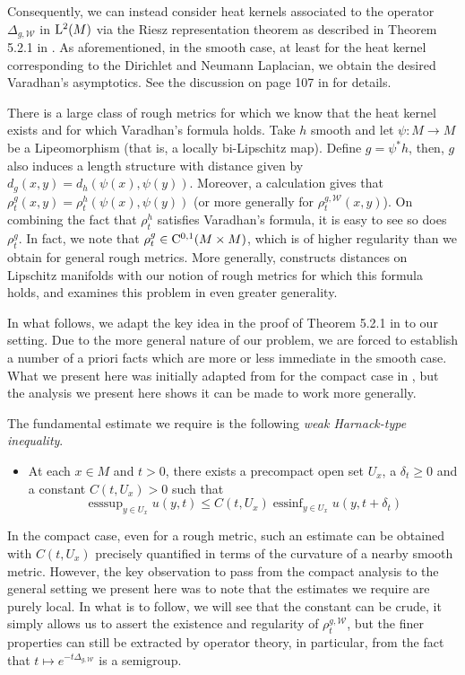 \documentclass[a4paper, 12pt]{amsart}
\numberwithin{equation}{section}
\renewcommand{\~}{\tilde}
\renewcommand{\-}{\bar}
\newcommand{\8}{\infty}
\newcommand{\cW}{\mathcal{W}}
\DeclareMathOperator{\esssup}{esssup}
\DeclareMathOperator{\essinf}{essinf}
\newcommand{\pullb}[1]{{#1}^\ast}			%
\newcommand{\Lp}[2][{}]{{\rm L}^{#2}_{\rm #1}}		%
\newcommand{\Ck}[2][{}]{{\rm C}^{#2}_{\rm #1}}		%
\newcommand{\hk}{\rho}
\begin{document}
Consequently, we can instead consider heat kernels
associated to the operator $\Delta_{g,\cW}$ in $\Lp{2}(M)$
via the Riesz representation theorem as described in Theorem 
5.2.1 in \cite{Davies}. As aforementioned, in the smooth case,
at least for the heat kernel corresponding to the 
Dirichlet and Neumann Laplacian, we obtain the desired  Varadhan's
asymptotics. See the discussion on page 107 in \cite{ERS} for details.

There is a large class of rough metrics
for which we know that the heat kernel exists
and for which Varadhan's formula holds. 
Take $h$ smooth and let $\psi:M \to M$
be a Lipeomorphism (that is, a locally bi-Lipschitz map).
Define $g = \pullb{\psi}h$, then, $g$ 
also induces a length structure with 
distance given by $d_g(x,y) = d_h(\psi(x), \psi(y))$.
Moreover, a calculation gives
that $\hk^{g}_t(x,y) = \hk^{h}_t(\psi(x), \psi(y))$
(or more generally for $\hk^{g,\cW}_t(x,y)$). 
On combining the fact that $\hk^h_t$ satisfies
Varadhan's formula, it is easy to see
so does $\hk^{g}_t$. In fact, we 
note that $\hk^g_t \in \Ck{0,1}(M \times M)$,
which is of higher regularity than we
obtain for general rough metrics.
More generally, \cite{Norris} constructs
distances on Lipschitz manifolds with our
notion of rough metrics for which this 
formula holds, and \cite{ERS} examines
this problem in even greater generality.

In what follows, we adapt the key idea in 
the proof of Theorem 5.2.1 in \cite{Davies}
to our setting. Due to the more general 
nature of our problem, we are forced to 
establish a number of a priori facts which 
are more or less immediate in the smooth case.
What we present here was initially adapted from \cite{SC} 
for the compact case in \cite{BCont}, but 
the analysis we present here shows it can be made to work more generally. 

The fundamental estimate we
require is the following \emph{weak Harnack-type inequality}.
\begin{itemize}
\item[] At each $x \in M$ and $t > 0$, there exists a precompact
open set $U_x$, a $\delta_t \geq 0$ and a constant $C(t, U_x)  > 0$ such that
\begin{equation}
\tag{H}
\label{eq:Harnack}
\esssup_{y \in U_x} u(y,t) 
	\leq C(t, U_x)  \essinf_{y \in U_x} u(y, t + \delta_t)
\end{equation}
\end{itemize}

In the compact case, even for a
rough metric, such an estimate can be
obtained with $C(t,U_x)$ precisely quantified
in terms of the curvature of a nearby smooth metric.
However, the key observation to pass from the compact analysis
to the general setting we present here was to note that
the estimates we require are purely local. In 
what is to follow, we will see that the constant can be
crude, it simply allows us to assert the existence and regularity
of $\hk^{g,\cW}_t$, but the finer properties can still 
be extracted by operator theory, in particular, from the 
fact that $t \mapsto e^{-t\Delta_{g,\cW}}$ is a semigroup.
\end{document}
